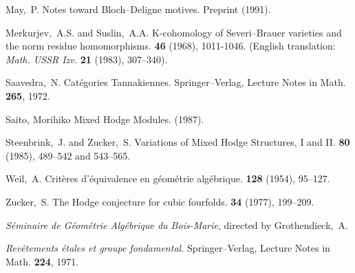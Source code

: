 \documentclass{article}
\theoremstyle{plain}
\theoremstyle{definition}
\begin{document}
\begin{thebibliography}{34}
  {\sc May,~P.}
  \newblock Notes toward Bloch--Deligne motives.
  \newblock Preprint (1991).

  {\sc Merkurjev,~A.S. and Suslin,~A.A.}
  \newblock K-cohomology of Severi--Brauer varieties and the norm residue homomorphisms.
   \textbf{46} (1968), 1011-1046.
  \newblock (English translation: {\em Math. USSR Izv.} \textbf{21} (1983), 307--340).

  {\sc Saavedra,~N.}
  \newblock Cat\'{e}gories Tannakiennes.
  \newblock Springer--Verlag, Lecture Notes in Math. \textbf{265}, 1972.

  {\sc Saito, Morihiko}
  \newblock Mixed Hodge Modules.
   (1987).

  {\sc Steenbrink,~J. and Zucker,~S.}
  \newblock Variations of Mixed Hodge Structures, I and II.
   \textbf{80} (1985), 489--542 and 543--565.

  {\sc Weil,~A.}
  \newblock Crit\`{e}res d'\'{e}quivalence en g\'{e}om\'{e}trie alg\'{e}brique.
   \textbf{128} (1954), 95--127.

  {\sc Zucker,~S.}
  \newblock The Hodge conjecture for cubic fourfolds.
   \textbf{34} (1977), 199--209.

  {\em S\'{e}minaire de G\'{e}om\'{e}trie Alg\'{e}brique du Bois-Marie}, directed by {\sc Grothendieck,~A.}

  {\em Rev\^{e}tements \'{e}tales et groupe fondamental.}
  \newblock Springer--Verlag, Lecture Notes in Math. \textbf{224}, 1971.

\end{thebibliography}
\end{document}
